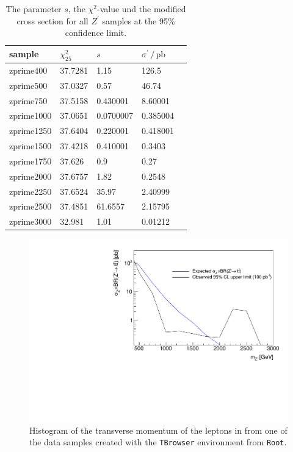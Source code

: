 \begin{table}[H]
  \centering
  \begin{tabular}{l|llll}
      sample           &  $\chi^2_{25}$  & $s$ & $\sigma^\prime \, / \, \si{\pico\barn}$ \\
      \hline
      zprime400  &   37.7281   &          1.15                      & 126.5           \\
      zprime500  &   37.0327   &          0.57                      & 46.74           \\
      zprime750  &   37.5158   &          0.430001                      & 8.60001         \\
      zprime1000 &   37.0651   &          0.0700007                      & 0.385004        \\
      zprime1250 &   37.6404   &          0.220001                      & 0.418001        \\
      zprime1500 &   37.4218   &          0.410001                      & 0.3403          \\
      zprime1750 &   37.626    &          0.9                      & 0.27            \\
      zprime2000 &   37.6757   &          1.82                      & 0.2548          \\
      zprime2250 &   37.6524   &          35.97                      & 2.40999         \\
      zprime2500 &   37.4851   &          61.6557                      & 2.15795         \\
      zprime3000 &   32.981    &          1.01                      & 0.01212         \\
      \end{tabular}
\caption{The parameter $s$, the $\chi^2$-value und the modified cross section for all $Z^\prime$ samples at the 95\% confidence limit.}
\label{tab:lim}

  \end{table}




  \begin{figure}[tb]
    \centering
    \includegraphics[width=.9\textwidth]{plots/limits.pdf}
    \caption{Histogram of the transverse momentum of the leptons in from one of the data samples created with the \texttt{TBrowser} environment from \texttt{Root}.}
    \label{fig:sigm}
  \end{figure}

